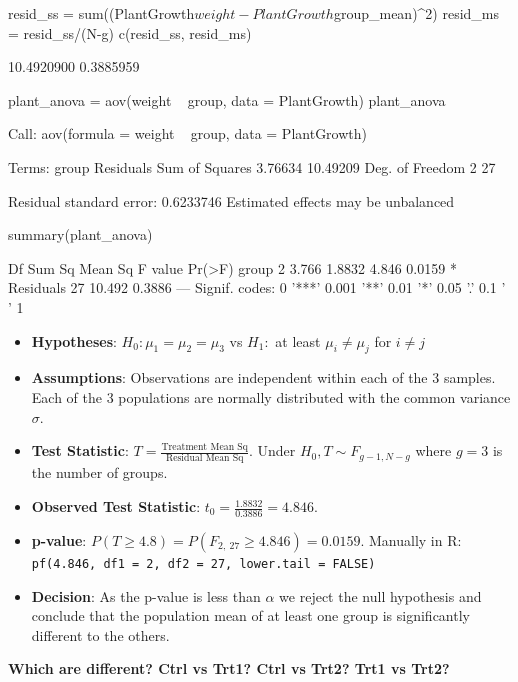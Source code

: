 \documentclass[a4paper]{article}\usepackage[]{graphicx}\usepackage[]{xcolor}
\begin{document}
\begin{Schunk}
\begin{Sinput}
resid_ss = sum((PlantGrowth$weight - PlantGrowth$group_mean)^2)
resid_ms = resid_ss/(N-g)
c(resid_ss, resid_ms)
\end{Sinput}
\begin{Soutput}
[1] 10.4920900  0.3885959
\end{Soutput}
\begin{Sinput}
plant_anova = aov(weight ~ group, data = PlantGrowth)
plant_anova
\end{Sinput}
\begin{Soutput}
Call:
   aov(formula = weight ~ group, data = PlantGrowth)

Terms:
                   group Residuals
Sum of Squares   3.76634  10.49209
Deg. of Freedom        2        27

Residual standard error: 0.6233746
Estimated effects may be unbalanced
\end{Soutput}
\begin{Sinput}
summary(plant_anova)
\end{Sinput}
\begin{Soutput}
            Df Sum Sq Mean Sq F value Pr(>F)  
group        2  3.766  1.8832   4.846 0.0159 *
Residuals   27 10.492  0.3886                 
---
Signif. codes:  0 '***' 0.001 '**' 0.01 '*' 0.05 '.' 0.1 ' ' 1
\end{Soutput}
\end{Schunk}
\begin{itemize}
	\item \textbf{Hypotheses}: \( H_0: \mu_1 = \mu_2 = \mu_3 \) vs \( H_1: \) at least \( \mu_i \neq \mu_j \) for \( i \neq j \) 
	\item \textbf{Assumptions}: Observations are independent within each of the 3 samples. Each of the 3 populations are normally distributed with the common variance \( \sigma \).
	\item \textbf{Test Statistic}: \( T = \frac{\text{Treatment Mean Sq}}{\text{Residual Mean Sq}} \). Under \( H_0, T \sim F_{g-1,N-g} \) where \( g = 3 \) is the number of groups.
	\item \textbf{Observed Test Statistic}: \( t_0 = \frac{1.8832}{0.3886} = 4.846 \).
	\item \textbf{p-value}: \( P(T \geq 4.8) = P(F_{2,\ 27} \geq 4.846) = 0.0159 \). Manually in R: \lstinline|pf(4.846, df1 = 2, df2 = 27, lower.tail = FALSE)|
	\item \textbf{Decision}: As the p-value is less than \( \alpha \) we reject the null hypothesis and conclude that the population mean of at least one group is significantly different to the others.
\end{itemize}
\begin{greenbox}
	\textbf{Which are different? Ctrl vs Trt1? Ctrl vs Trt2? Trt1 vs Trt2?}
\end{greenbox}
\end{document}
